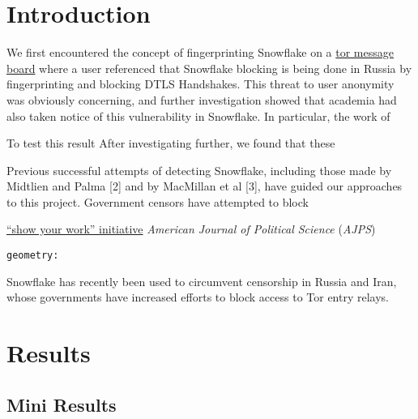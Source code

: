 \documentclass[11pt,]{article}
\begin{document}
\vskip -8.5pt



\noindent  

\section{Introduction}\label{introduction}

We first encountered the concept of fingerprinting Snowflake on a
\href{https://ntc.party/t/ooni-reports-of-tor-blocking-in-certain-isps-since-2021-12-01/1477}{tor
message board} where a user referenced that Snowflake blocking is being
done in Russia by fingerprinting and blocking DTLS Handshakes. This
threat to user anonymity was obviously concerning, and further
investigation showed that academia had also taken notice of this
vulnerability in Snowflake. In particular, the work of

To test this result After investigating further, we found that these

Previous successful attempts of detecting Snowflake, including those
made by Midtlien and Palma {[}2{]} and by MacMillan et al {[}3{]}, have
guided our approaches to this project. Government censors have attempted
to block

\href{http://ajps.org/2015/03/26/the-ajps-replication-policy-innovations-and-revisions/}{``show
your work'' initiative} \emph{American Journal of Political Science}
(\emph{AJPS})

\texttt{geometry:}

Snowflake has recently been used to circumvent censorship in Russia and
Iran, whose governments have increased efforts to block access to Tor
entry relays.

\section{Results}\label{results}

\subsection{Mini Results}\label{mini-results}
\end{document}
